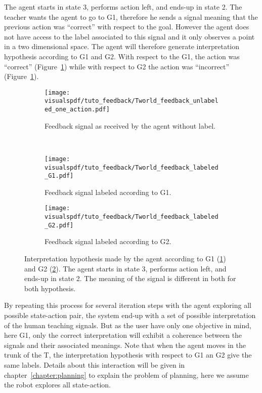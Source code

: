 The agent starts in state 3, performs action left, and ends-up in state 2. The teacher wants the agent to go to G1, therefore he sends a signal meaning that the previous action was ``correct'' with respect to the goal. However the agent does not have access to the label associated to this signal and it only observes a point in a two dimensional space. The agent will therefore generate interpretation hypothesis according to G1 and G2. With respect to the G1, the action was ``correct'' (Figure~\ref{fig:TworldLabelG1}) while with respect to G2 the action was ``incorrect'' (Figure~\ref{fig:TworldLabelG1}).

\begin{figure}[!ht]
    \centering
    \begin{subfigure}[b]{\tworldsize\columnwidth}
        \centering
        \texttt{[image: \\visualspdf/tuto\_feedback/Tworld\_feedback\_unlabeled\_one\_action.pdf]}
        \caption{Feedback signal as received by the agent without label.}
    \end{subfigure}\\
    \begin{subfigure}[b]{\tworldsize\columnwidth}
        \centering
        \texttt{[image: \\visualspdf/tuto\_feedback/Tworld\_feedback\_labeled\_G1.pdf]}
        \caption{Feedback signal labeled according to G1.}
        \label{fig:TworldLabelG1}
    \end{subfigure}
    \begin{subfigure}[b]{\tworldsize\columnwidth}
        \centering
        \texttt{[image: \\visualspdf/tuto\_feedback/Tworld\_feedback\_labeled\_G2.pdf]}
        \caption{Feedback signal labeled according to G2.}
        \label{fig:TworldLabelG2}
    \end{subfigure}
    \caption{Interpretation hypothesis made by the agent according to G1 (\ref{fig:TworldLabelG1}) and G2 (\ref{fig:TworldLabelG2}). The agent starts in state 3, performs action left, and ends-up in state 2. The meaning of the signal is different in both for both hypothesis.}
    \label{fig:TworldLabelOneStep}
\end{figure}

By repeating this process for several iteration steps with the agent exploring all possible state-action pair, the system end-up with a set of possible interpretation of the human teaching signals. But as the user have only one objective in mind, here G1, only the correct interpretation will exhibit a coherence between the signals and their associated meanings. Note that when the agent moves in the trunk of the T, the interpretation hypothesis with respect to G1 an G2 give the same labels. Details about this interaction will be given in chapter~\ref{chapter:planning} to explain the problem of planning, here we assume the robot explores all state-action.

